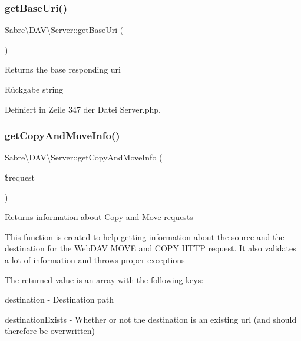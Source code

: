 \subsubsection{\texorpdfstring{get\+Base\+Uri()}{getBaseUri()}}
{\footnotesize\ttfamily Sabre\textbackslash{}\+D\+A\+V\textbackslash{}\+Server\+::get\+Base\+Uri (\begin{DoxyParamCaption}{ }\end{DoxyParamCaption})}

Returns the base responding uri

\begin{DoxyReturn}{Rückgabe}
string 
\end{DoxyReturn}


Definiert in Zeile 347 der Datei Server.\+php.

\mbox{\label{class_sabre_1_1_d_a_v_1_1_server_afb6c0f88c5eacd47185731b933a3d5bb}} 
\subsubsection{\texorpdfstring{get\+Copy\+And\+Move\+Info()}{getCopyAndMoveInfo()}}
{\footnotesize\ttfamily Sabre\textbackslash{}\+D\+A\+V\textbackslash{}\+Server\+::get\+Copy\+And\+Move\+Info (\begin{DoxyParamCaption}\item[{\mbox{\hyperlink{interface_sabre_1_1_h_t_t_p_1_1_request_interface}{Request\+Interface}}}]{\$request }\end{DoxyParamCaption})}

Returns information about Copy and Move requests

This function is created to help getting information about the source and the destination for the Web\+D\+AV M\+O\+VE and C\+O\+PY H\+T\+TP request. It also validates a lot of information and throws proper exceptions

The returned value is an array with the following keys\+:
\begin{DoxyItemize}
\item destination -\/ Destination path
\item destination\+Exists -\/ Whether or not the destination is an existing url (and should therefore be overwritten)
\end{DoxyItemize}


